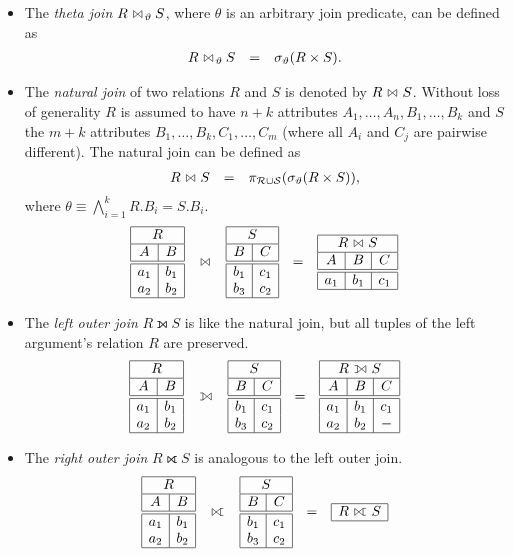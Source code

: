 \begin{itemize}
\item The \emph{theta join} $R \join_\theta S$, where $\theta$ is an arbitrary join predicate, can be defined as
	\[ \begin{array}{rcl}
	R \join_\theta S & = & \sigma_\theta(R \times S).
	\end{array} \]
\item The \emph{natural join} of two relations $R$ and $S$ is denoted by $R \join S$. Without loss of generality $R$ is assumed to have $n+k$ attributes $A_1,\ldots,A_n,B_1,\ldots,B_k$ and $S$ the $m+k$ attributes $B_1,\ldots,B_k,C_1,\ldots,C_m$ (where all $A_i$ and $C_j$ are pairwise different). The natural join can be defined as
	\[ \begin{array}{rcl}
	R \join S & =  & \pi_{\mc{R} \cup \mc{S}}(\sigma_\theta(R \times S)),
	\end{array} \]
	where $\theta \equiv \bigwedge_{i=1}^k R.B_i = S.B_i$.
	\[
	\begin{array}{ccccc}
	\lefttable & \join & \righttable
	& = &
	\begin{array}{|c|c|c|} \hline
	\multicolumn{3}{|c|}{R \join S} \\\hline
	A & B & C \\\hline\hline
	a_1 & b_1 & c_1 \\\hline
	\end{array}
	\end{array}
	\]
\item The \emph{left outer join} $R \leftouterjoin S$ is like the natural join, but all tuples of the left argument's relation $R$ are preserved.
	\[
	\begin{array}{ccccc}
	\lefttable & \leftouterjoin & \righttable
	& = &
	\begin{array}{|c|c|c|} \hline
	\multicolumn{3}{|c|}{R \leftouterjoin S} \\\hline
	A & B & C \\\hline\hline
	a_1 & b_1 & c_1 \\
	a_2 & b_2 & - \\\hline
	\end{array}
	\end{array}
	\]
\item The \emph{right outer join} $R \rightouterjoin S$ is analogous to the left outer join.
	\[
	\begin{array}{ccccc}
	\lefttable & \rightouterjoin & \righttable
	& = &
	\begin{array}{|c|c|c|} \hline
	\multicolumn{3}{|c|}{R \rightouterjoin S} \\\hline

\end{array}
\end{array}\]
\end{itemize}
